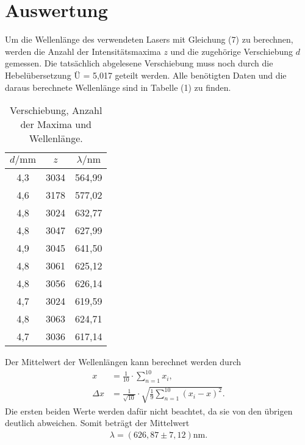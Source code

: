 \section{Auswertung}
\label{sec:Auswertung}

Um die Wellenlänge des verwendeten Lasers mit Gleichung (7) zu berechnen, werden die Anzahl der Intensitätsmaxima $z$ und die zugehörige Verschiebung $d$ gemessen.
Die tatsächlich abgelesene Verschiebung muss noch durch die Hebelübersetzung Ü = 5,017 geteilt werden. 
Alle benötigten Daten und die daraus berechnete Wellenlänge sind in Tabelle (1) zu finden.
\begin{table}[H]
\centering
\caption{Verschiebung, Anzahl der Maxima und Wellenlänge.}
\label{tab:einzel1}
\begin{tabular}{c c c}
\toprule
$d/\si{\milli\meter}$ & $z$ & $\lambda/\si{\nano\meter}$\\
\midrule
4,3 & 3034 & 564,99 \\
4,6 & 3178 & 577,02 \\
4,8 & 3024 & 632,77 \\
4,8 & 3047 & 627,99 \\
4,9 & 3045 & 641,50 \\
4,8 & 3061 & 625,12 \\
4,8 & 3056 & 626,14 \\
4,7 & 3024 & 619,59 \\
4,8 & 3063 & 624,71 \\
4,7 & 3036 & 617,14 \\
\bottomrule
\end{tabular}
\end{table}

Der Mittelwert der Wellenlängen kann berechnet werden durch
\begin{align*}
x &= \frac{1}{10}\cdot \sum_{n=1}^{10} x_i,\\
\Delta x &=\frac{1}{\sqrt{10}} \cdot \sqrt{\frac{1}{9} \sum_{n=1}^{10} (x_i - x)^2}.
\end{align*}
Die ersten beiden Werte werden dafür nicht beachtet, da sie von den übrigen deutlich abweichen. Somit beträgt der Mittelwert 
\begin{align*}
\lambda = (626,87 \pm 7,12) \si{\nano\meter} .
\end{align*}

